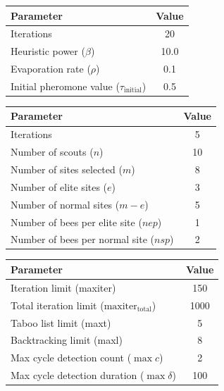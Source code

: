 \documentclass[paper=a4, fontsize=9pt]{scrartcl}
\begin{document}
\begin{multicols}{2}
{
\begin{minipage}{\linewidth{}}
\centering
\begin{tabular}{lc}
\toprule
Parameter                                         & Value \\
\midrule
Iterations                                        & 20    \\
Heuristic power ($\beta$)                         & 10.0  \\
Evaporation rate ($\rho$)                         &  0.1  \\
Initial pheromone value ($\tau_{\text{initial}}$) &  0.5  \\
\bottomrule
\end{tabular}
\label{table:acoparams}
\end{minipage}
}

{
\begin{minipage}{\linewidth{}}
\centering
\begin{tabular}{lc}
\toprule
Parameter                              & Value \\
\midrule
Iterations                             &  5 \\
Number of scouts ($n$)                 & 10 \\
Number of sites selected ($m$)         &  8 \\
Number of elite sites ($e$)            &  3 \\
Number of normal sites ($m-e$)         &  5 \\
Number of bees per elite site ($nep$)  &  1 \\
Number of bees per normal site ($nsp$) &  2 \\
\bottomrule
\end{tabular}
\label{table:baparams}
\end{minipage}
}

{
\begin{minipage}{\linewidth{}}
\centering
\begin{tabular}{lc}
\toprule
Parameter                                             & Value \\
\midrule
Iteration limit (maxiter)                             &   150 \\
Total iteration limit ($\text{maxiter}_\text{total}$) &  1000 \\
Taboo list limit (maxt)                               &     5 \\
Backtracking limit (maxl)                             &     8 \\
Max cycle detection count ($\max c$)                  &     2 \\
Max cycle detection duration ($\max \delta$)          &   100 \\
\bottomrule
\end{tabular}
\label{table:tsparams}
\end{minipage}
}

\end{multicols}
\end{document}
